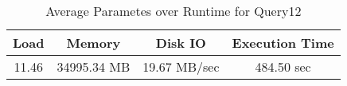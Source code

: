 \documentclass[../../main.tex]{subfiles}
\begin{document}
    \begin{table}
        \begin{center}
            \begin{tabular}{ |c|c|c|c| } 
            \hline
            Load & Memory & Disk IO & Execution Time\\
            \hline
            11.46 & 34995.34 MB & 19.67 MB/sec & 484.50 sec \\
            \hline
            \end{tabular}
            \\[1pt]
            \caption{Average Parametes over Runtime for Query12}
        \end{center}
    \end{table}
    \pagebreak
\end{document}
